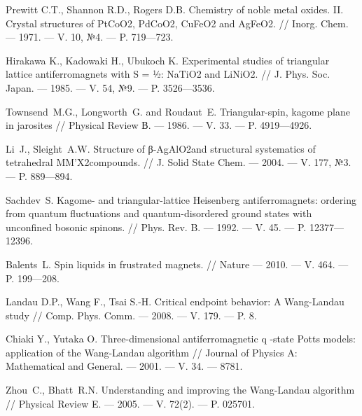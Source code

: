 \begin{thebibliography}{11}
Prewitt C.T., Shannon R.D., Rogers D.B.
Chemistry of noble metal oxides. II. Crystal structures of PtCoO2, PdCoO2, CuFeO2 and AgFeO2.
//
Inorg. Chem.
--- 1971.
--- V. 10, №4.
--- P. 719---723.





Hirakawa K., Kadowaki H., Ubukoch K.
Experimental studies of triangular lattice antiferromagnets with S = ½: NaTiO2 and LiNiO2.
//
J. Phys. Soc. Japan.
--- 1985.
--- V. 54, №9.
--- P. 3526---3536.





Townsend~M.G., Longworth~G. and Roudaut~E.
Triangular-spin, kagome plane in jarosites 
// 
Physical Review В.
--- 1986.
--- V. 33.
--- P. 4919---4926.





Li~J., Sleight~A.W. 
Structure of β-AgAlO2and structural systematics of tetrahedral MM'X2compounds. 
// 
J. Solid State Chem. 
--- 2004. 
--- V. 177, №3.
--- P. 889---894.





Sachdev~S. 
Kagome- and triangular-lattice Heisenberg antiferromagnets: ordering from quantum fluctuations and quantum-disordered ground states with unconfined bosonic spinons. 
//
Phys. Rev. B.
--- 1992.
--- V. 45.
--- P. 12377---12396.





Balents~L. 
Spin liquids in frustrated magnets.
// 
Nature
--- 2010.
--- V. 464.
--- P. 199---208.





Landau D.P., Wang F., Tsai S.-H.
Critical endpoint behavior: A Wang-Landau study
//
Comp. Phys. Comm.
--- 2008.
--- V. 179.
--- P. 8.





Chiaki Y., Yutaka O.
Three-dimensional antiferromagnetic q -state Potts models: application of the Wang-Landau algorithm
//
Journal of Physics A: Mathematical and General.
--- 2001.
--- V. 34.
--- 8781.





Zhou~C., Bhatt~R.N. 
Understanding and improving the Wang-Landau algorithm 
//
Physical Review E.
--- 2005.
--- V. 72(2).
--- P. 025701.


\end{thebibliography}
